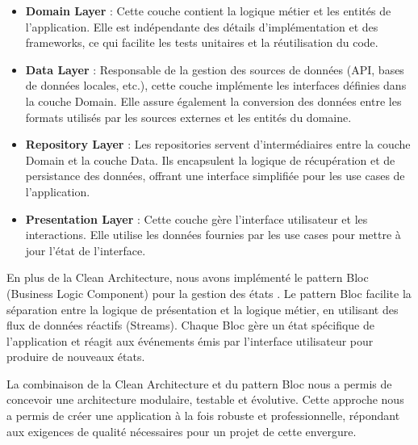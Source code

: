 \begin{itemize}[noitemsep]
    \item \textbf{Domain Layer} : Cette couche contient la logique métier et les entités de l'application. Elle est indépendante des détails d'implémentation et des frameworks, ce qui facilite les tests unitaires et la réutilisation du code.
    \item \textbf{Data Layer} : Responsable de la gestion des sources de données (API, bases de données locales, etc.), cette couche implémente les interfaces définies dans la couche Domain. Elle assure également la conversion des données entre les formats utilisés par les sources externes et les entités du domaine.
    \item \textbf{Repository Layer} : Les repositories servent d'intermédiaires entre la couche Domain et la couche Data. Ils encapsulent la logique de récupération et de persistance des données, offrant une interface simplifiée pour les use cases de l'application.
    \item \textbf{Presentation Layer} : Cette couche gère l'interface utilisateur et les interactions. Elle utilise les données fournies par les use cases pour mettre à jour l'état de l'interface.
\end{itemize}

En plus de la Clean Architecture, nous avons implémenté le pattern Bloc (Business Logic Component) pour la gestion des états \cite{blocPattern}. Le pattern Bloc facilite la séparation entre la logique de présentation et la logique métier, en utilisant des flux de données réactifs (Streams). Chaque Bloc gère un état spécifique de l'application et réagit aux événements émis par l'interface utilisateur pour produire de nouveaux états.

La combinaison de la Clean Architecture et du pattern Bloc nous a permis de concevoir une architecture modulaire, testable et évolutive. Cette approche nous a permis de créer une application à la fois robuste et professionnelle, répondant aux exigences de qualité nécessaires pour un projet de cette envergure.


